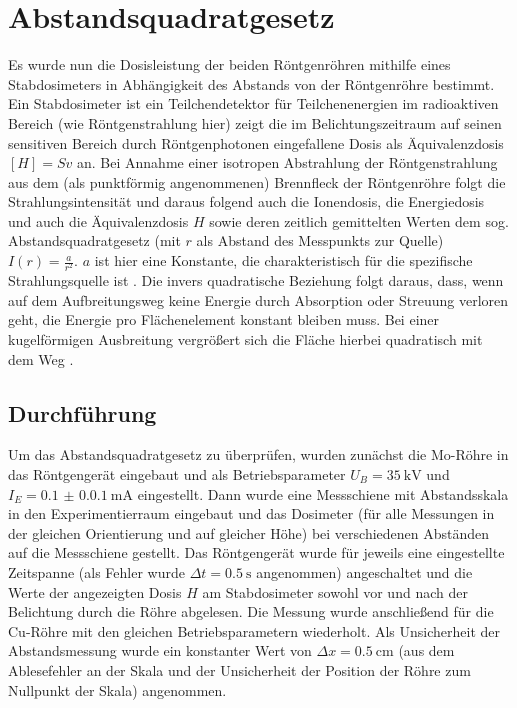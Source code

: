 \chapter{Abstandsquadratgesetz}

Es wurde nun die Dosisleistung der beiden Röntgenröhren mithilfe eines Stabdosimeters in Abhängigkeit des Abstands von der Röntgenröhre bestimmt. Ein Stabdosimeter ist ein Teilchendetektor für Teilchenenergien im radioaktiven Bereich (wie Röntgenstrahlung hier) zeigt die im Belichtungszeitraum auf seinen sensitiven Bereich durch Röntgenphotonen eingefallene Dosis als Äquivalenzdosis $[H] = \unit{Sv}$ an. Bei Annahme einer isotropen Abstrahlung der Röntgenstrahlung aus dem (als punktförmig angenommenen) Brennfleck der Röntgenröhre folgt die Strahlungsintensität und daraus folgend auch die Ionendosis, die Energiedosis und auch die Äquivalenzdosis $H$ sowie deren zeitlich gemittelten Werten dem sog. Abstandsquadratgesetz (mit $r$ als Abstand des Messpunkts zur Quelle) $I(r) = \frac{a}{r^2}$. $a$ ist hier eine Konstante, die charakteristisch für die spezifische Strahlungsquelle ist \cite[350-351]{dosimetriekrieger}. Die invers quadratische Beziehung folgt daraus, dass, wenn auf dem Aufbreitungsweg keine Energie durch Absorption oder Streuung verloren geht, die Energie pro Flächenelement konstant bleiben muss. Bei einer kugelförmigen Ausbreitung vergrößert sich die Fläche hierbei quadratisch mit dem Weg \cite[351]{dosimetriekrieger}.

\section{Durchführung}

Um das Abstandsquadratgesetz zu überprüfen, wurden zunächst die Mo-Röhre in das Röntgengerät eingebaut und als Betriebsparameter $U_B = \SI{35}{\kilo\volt}$ und $I_E = \SI{0.1(0.01)}{\milli\A}$ eingestellt. Dann wurde eine Messschiene mit Abstandsskala in den Experimentierraum eingebaut und das Dosimeter (für alle Messungen in der gleichen Orientierung und auf gleicher Höhe) bei verschiedenen Abständen auf die Messschiene gestellt. Das Röntgengerät wurde für jeweils eine eingestellte Zeitspanne (als Fehler wurde $\Delta t = \SI{0.5}{\s}$ angenommen) angeschaltet und die Werte der angezeigten Dosis $H$ am Stabdosimeter sowohl vor und nach der Belichtung durch die Röhre abgelesen. Die Messung wurde anschließend für die Cu-Röhre mit den gleichen Betriebsparametern wiederholt. Als Unsicherheit der Abstandsmessung wurde ein konstanter Wert von $\Delta x= \SI{0.5}{\centi\meter}$ (aus dem Ablesefehler an der Skala und der Unsicherheit der Position der Röhre zum Nullpunkt der Skala) angenommen.

